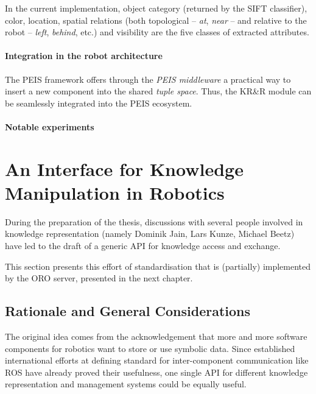 In the current implementation, object category (returned by the SIFT
classifier), color, location, spatial relations (both topological -- \emph{at},
\emph{near} -- and relative to the robot -- \emph{left}, \emph{behind}, etc.)
and visibility are the five classes of extracted attributes.

\paragraph{Integration in the robot architecture}
\label{sect|peis-integration}

The PEIS framework offers through the \emph{PEIS middleware} a practical way to
insert a new component into the shared \emph{tuple space}.  Thus, the KR\&R
module can be seamlessly integrated into the PEIS ecosystem.

\paragraph{Notable experiments}
\label{sect|peis-expe}




\section{An Interface for Knowledge Manipulation in Robotics}
\label{sect|knowledge-api}

During the preparation of the thesis, discussions with several people involved
in knowledge representation (namely Dominik Jain, Lars Kunze, Michael Beetz)
have led to the draft of a generic API for knowledge access and exchange.

This section presents this effort of standardisation that is (partially)
implemented by the ORO server, presented in the next chapter.

\subsection{Rationale and General Considerations}

The original idea comes from the acknowledgement that more and more software
components for robotics want to store or use symbolic data. Since established
international efforts at defining standard for inter-component communication
like ROS have already proved their usefulness, one single API for different
knowledge representation and management systems could be equally useful.

